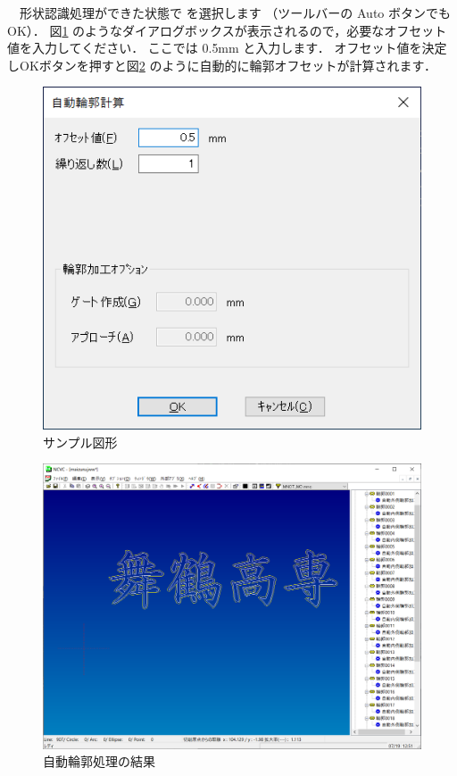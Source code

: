 


\vspace*{1.5zh}
\begin{minipage}[t]{0.5\textwidth}
　形状認識処理ができた状態で  を選択します
（ツールバーの Auto ボタンでもOK）．
図\ref{fig:auto.png} のようなダイアログボックスが表示されるので，必要なオフセット値を入力してください．
ここでは 0.5mm と入力します．
オフセット値を決定しOKボタンを押すと図\ref{fig:maizuru3.png} のように自動的に輪郭オフセットが計算されます．
\end{minipage}
\begin{minipage}[t]{0.5\textwidth}
\vspace*{-2zh}
\begin{figure}[H]
\centering
\includegraphics[scale=0.7]{No2/fig/auto.png}
\caption{サンプル図形}
\label{fig:auto.png}
\end{figure}
\end{minipage}

\begin{figure}[H]
\centering
\includegraphics[scale=0.5]{No2/fig/maizuru3.png}
\caption{自動輪郭処理の結果}
\label{fig:maizuru3.png}
\end{figure}
